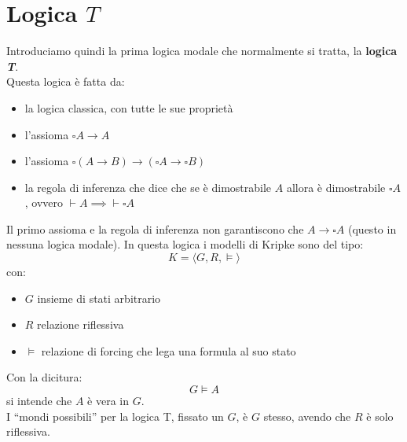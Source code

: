 \documentclass[a4paper,12pt, oneside]{book}
\begin{document}
\section{Logica $T$}
Introduciamo quindi la prima logica modale che normalmente si tratta, la
\textbf{logica \textit{T}}.\\
Questa logica è fatta da:
\begin{itemize}
  \item la logica classica, con tutte le sue proprietà
  \item l'assioma $\square A\to A$
  \item l'assioma $\square(A\to B)\to(\square A\to\square B)$
  \item la regola di inferenza che dice che se è dimostrabile $A$ allora è
  dimostrabile $\square A$, ovvero $\vdash A\implies \vdash \square A$
\end{itemize}
Il primo assioma e la regola di inferenza non garantiscono che $A\to\square A$
(questo in nessuna logica modale).
In questa logica i modelli di Kripke sono del tipo:
\[K=\langle G, R, \vDash\rangle\]
con:
\begin{itemize}
  \item $G$ insieme di stati arbitrario
  \item $R$ relazione riflessiva
  \item $\vDash$ relazione di forcing che lega una formula al suo stato
\end{itemize}
Con la dicitura:
\[G\vDash A\]
si intende che $A$ è vera in $G$. \\
I ``mondi possibili'' per la logica T, fissato un $G$, è $G$ stesso, avendo che
$R$ è solo riflessiva. 
\end{document}
